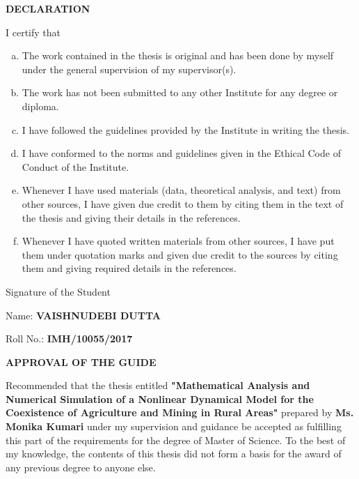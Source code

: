 \documentclass[12pt,a4wide]{report}
\numberwithin{equation}{chapter}
\numberwithin{theorem}{chapter}
\begin{document}
\clearpage
{} 
\begin{center}
{\Large{\bf{DECLARATION}}}
\end{center}
\noindent
I certify that\\
	\vspace{-1.5cm}
\begin{enumerate}[a.]
	\item The work contained in the thesis is original and has been done by myself under the general supervision of my supervisor(s).\\
	\vspace{-1cm}
    \item The work has not been submitted to any other Institute for any degree or diploma.\\
    	\vspace{-1cm}
   \item  I have followed the guidelines provided by the Institute in writing the thesis.\\
   	\vspace{-1cm}
   \item  I have conformed to the norms and guidelines given in the Ethical Code of Conduct of the Institute.\\
   	\vspace{-1cm}
   \item  Whenever I have used materials (data, theoretical analysis, and text) from other sources, I have given due credit to them by citing them in the text of the thesis and giving their details in the references.\\
   	\vspace{-1cm}
   \item  Whenever I have quoted written materials from other sources, I have put them under quotation marks and given due credit to the sources by citing them and giving required details in the references.\\
   	
\end{enumerate}	

\hfill Signature of the Student

\hfill Name:\textbf{ VAISHNUDEBI DUTTA}

\hfill Roll No.: \textbf{IMH/10055/2017}

\clearpage

\begin{center}
	{\Large{\bf{APPROVAL OF THE GUIDE}}}
\end{center}
\noindent
Recommended that the thesis entitled \textbf{"Mathematical Analysis and Numerical Simulation of a Nonlinear Dynamical Model for the Coexistence of Agriculture and Mining in Rural Areas"} prepared by \textbf{Ms. Monika Kumari} under my supervision and guidance be accepted as fulfilling this part of the requirements for the degree of Master of Science.
To the best of my knowledge, the contents of this thesis did not form a basis for the award of any previous degree to anyone else.
\end{document}
